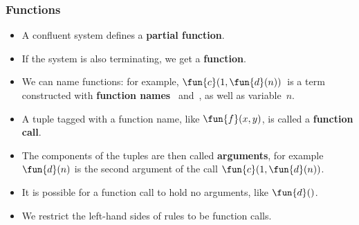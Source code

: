\documentclass[compress,dvips,xcolor={dvipsnames},t]{beamer}
\begin{document}
\begin{frame}
  \frametitle{Functions}

  \begin{itemize}

    \item A confluent system defines a \textbf{partial function}.

    \item If the system is also terminating, we get a
      \textbf{function}.

    \item We can name functions: for example, \(\fun{c}(1,
      \fun{d}(n))\)~is a term constructed with \textbf{function names}
      ~and~, as well as variable~\(n\).

    \item A tuple tagged with a function name, like \(\fun{f}(x,y)\),
      is called a \textbf{function call}.

    \item The components of the tuples are then called
      \textbf{arguments}, for example \(\fun{d}(n)\) is the second
      argument of the call \(\fun{c}(1, \fun{d}(n))\).

    \item It is possible for a function call to hold no arguments,
      like \(\fun{d}()\).

    \item We restrict the left\hyp{}hand sides of rules to be function
      calls.

  \end{itemize}

\end{frame}
\end{document}
